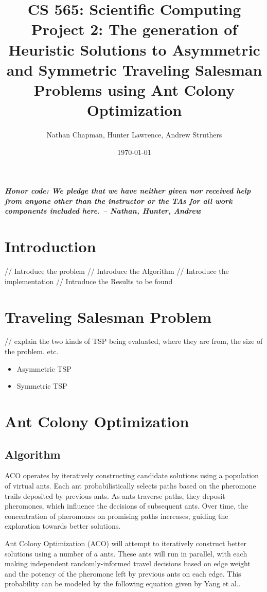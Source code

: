 \documentclass{article}
\title{\vspace*{-0.625in}CS 565: Scientific Computing \\ Project 2: The generation of Heuristic Solutions to Asymmetric and Symmetric Traveling Salesman Problems using Ant Colony Optimization\vspace*{-0.25in}}
\author{Nathan Chapman, Hunter Lawrence, Andrew Struthers}
\date{\today}
\begin{document}
\maketitle
\tableofcontents
\pagebreak
\textbf{\textit{Honor code: We pledge that we have neither given nor received help from anyone other than the instructor or the TAs for all work components included here. -- Nathan, Hunter, Andrew}}

\section{Introduction}
    // Introduce the problem
    // Introduce the Algorithm
    // Introduce the implementation
    // Introduce the Results to be found

\section{Traveling Salesman Problem}
    // explain the two kinds of TSP being evaluated, where they are from, the size of the problem. etc.

    \begin{itemize}
        \item Asymmetric TSP
        \item Symmetric TSP
    \end{itemize}

\section{Ant Colony Optimization}

\subsection{Algorithm}
ACO operates by iteratively constructing candidate solutions using a population of virtual ants. Each ant probabilistically selects paths based on the pheromone trails deposited by previous ants. As ants traverse paths, they deposit pheromones, which influence the decisions of subsequent ants. Over time, the concentration of pheromones on promising paths increases, guiding the exploration towards better solutions.

Ant Colony Optimization (ACO) will attempt to iteratively construct better solutions using a number of $a$ ants. These ants will run in parallel, with each making independent randomly-informed travel decisions based on edge weight and the potency of the pheromone left by previous ants on each edge. This probability can be modeled by the following equation given by Yang et al.\cite{yang2008ant}.
\end{document}
